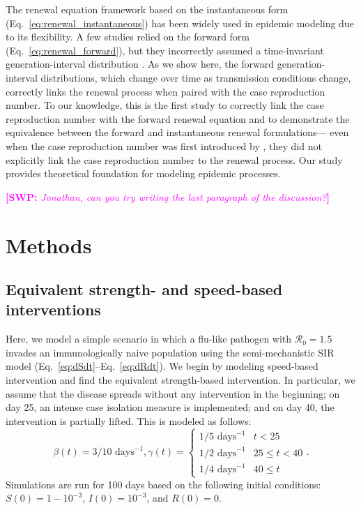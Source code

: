 \documentclass[12pt]{article}
\newcommand{\comment}{\showcomment}
\newcommand{\showcomment}[3]{\textcolor{#1}{\textbf{[#2: }\textsl{#3}\textbf{]}}}
\newcommand{\swp}[1]{\comment{magenta}{SWP}{#1}}
\newcommand{\eref}[1]{Eq.~\ref{eq:#1}}
\newcommand{\Rx}[1]{\ensuremath{{\mathcal R}_{#1}}\xspace}
\newcommand{\Ro}{\Rx{0}}
\begin{document}
The renewal equation framework based on the instantaneous form (\eref{renewal_instantaneous}) has been widely used in epidemic modeling due to its flexibility.
A few studies relied on the forward form (\eref{renewal_forward}), but they incorrectly assumed a time-invariant generation-interval distribution \citep{nishiura2007time,alvarez2020variational,white2021statistical}.
As we show here, the forward generation-interval distributions, which change over time as transmission conditions change, correctly links the renewal process when paired with the case reproduction number.
To our knowledge, this is the first study to correctly link the case reproduction number with the forward renewal equation and to demonstrate the equivalence between the forward and instantaneous renewal formulations---
even when the case reproduction number was first introduced by \cite{wallinga2004different}, they did not explicitly link the case reproduction number to the renewal process.
Our study provides theoretical foundation for modeling epidemic processes.

\swp{Jonathan, can you try writing the last paragraph of the discussion?}

\section{Methods}

\subsection{Equivalent strength- and speed-based interventions}

Here, we model a simple scenario in which a flu-like pathogen with $\Ro = 1.5$ invades an immunologically naive population using the semi-mechanistic SIR model (\eref{dSdt}--\eref{dRdt}).
We begin by modeling speed-based intervention and find the equivalent strength-based intervention.  
In particular, we assume that the disease spreads without any intervention in the beginning;
on day 25, an intense case isolation measure is implemented; and
on day 40, the intervention is partially lifted.
This is modeled as follows:
\begin{equation}
\beta(t) = 3/10\,\,\textrm{days}^{-1}, \gamma(t) = \begin{cases}
1/5\,\, \textrm{days}^{-1} & t < 25\\
1/2\,\, \textrm{days}^{-1} & 25 \leq t < 40 \\
1/4\,\, \textrm{days}^{-1} & 40 \leq t
\end{cases}.
\end{equation}
Simulations are run for 100 days based on the following initial conditions: $S(0) = 1 - 10^{-3}$, $I(0) = 10^{-3}$, and $R(0) = 0$.
\end{document}
